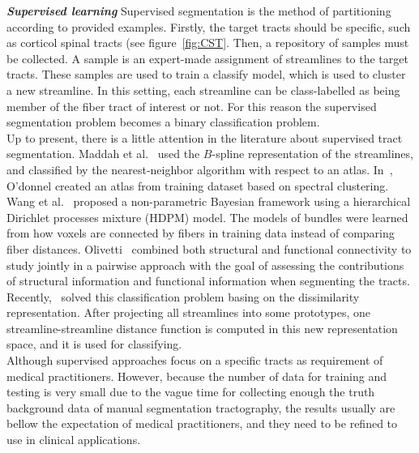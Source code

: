 \textbf{\textit{Supervised learning}}
Supervised segmentation is the method of partitioning according to provided examples. 
Firstly, the target tracts should be specific, such as corticol spinal tracts (see figure~\ref{fig:CST}. Then, a repository of samples must be collected. A sample is an expert-made assignment of streamlines to the target tracts. These samples are used to train a classify model, which is used to cluster a new streamline. In this setting, each streamline can be class-labelled as being member of the fiber tract of interest or not. For this reason the supervised segmentation problem becomes a binary classification problem. 
\\Up to present, there is a little attention in the literature about supervised tract segmentation.
Maddah et al.~\cite{maddah2005automated} used the $B$-spline representation of the streamlines, and classified by the nearest-neighbor algorithm with respect to an atlas. 
In~\cite{odonnell2007automatic}, O'donnel created an atlas from training dataset based on spectral clustering. 
Wang et al.~\cite{wang2011tractography} proposed a non-parametric Bayesian framework using a hierarchical Dirichlet processes mixture (HDPM) model. %
The models of bundles were learned from how voxels are connected by fibers in training data instead of comparing fiber distances. Olivetti~\cite{olivetti2010brain} combined both structural and functional connectivity to study jointly in a pairwise approach with the goal of assessing the contributions of structural information and functional information when segmenting the tracts. Recently,~\cite{olivetti2011supervised} solved this classification problem basing on the dissimilarity representation. After projecting all streamlines into some prototypes, one streamline-streamline distance function is computed in this new representation space, and it is used for classifying.
\\Although supervised approaches focus on a specific tracts as requirement of medical practitioners. %
However,
because the number of data for training and testing is very small due to the vague time for collecting enough the truth background data of manual segmentation tractography, the results usually are bellow the expectation of medical practitioners, and they need to be refined to use in clinical applications.
